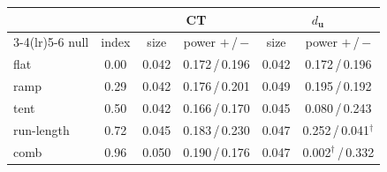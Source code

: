 \begin{tabular}{@{}lc cc cc@{}}
\toprule
 & & \multicolumn{2}{c}{CT} & \multicolumn{2}{c}{$d_{\mathbf u}$} \\
\cmidrule(lr){3-4}\cmidrule(lr){5-6}
null & index & size & power $+$\,/\,$-$ & size & power $+$\,/\,$-$ \\
\midrule
flat & 0.00 & 0.042 & 0.172\,/\,0.196 & 0.042 & 0.172\,/\,0.196 \\
ramp & 0.29 & 0.042 & 0.176\,/\,0.201 & 0.049 & 0.195\,/\,0.192 \\
tent & 0.50 & 0.042 & 0.166\,/\,0.170 & 0.045 & 0.080\,/\,0.243 \\
run-length & 0.72 & 0.045 & 0.183\,/\,0.230 & 0.047 & 0.252\,/\,0.041$^{\dagger}$ \\
comb & 0.96 & 0.050 & 0.190\,/\,0.176 & 0.047 & 0.002$^{\dagger}$\,/\,0.332 \\
\bottomrule
\end{tabular}